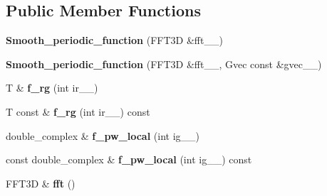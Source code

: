\subsection*{Public Member Functions}
\begin{DoxyCompactItemize}
\item 
\hypertarget{classsirius_1_1_smooth__periodic__function_a71442cf90200f79ef17bf18b0009fdb0}{}{\bfseries Smooth\+\_\+periodic\+\_\+function} (F\+F\+T3\+D \&fft\+\_\+\+\_\+)\label{classsirius_1_1_smooth__periodic__function_a71442cf90200f79ef17bf18b0009fdb0}

\item 
\hypertarget{classsirius_1_1_smooth__periodic__function_a8e8eb3649395eff9424649112195bcfe}{}{\bfseries Smooth\+\_\+periodic\+\_\+function} (F\+F\+T3\+D \&fft\+\_\+\+\_\+, Gvec const \&gvec\+\_\+\+\_\+)\label{classsirius_1_1_smooth__periodic__function_a8e8eb3649395eff9424649112195bcfe}

\item 
\hypertarget{classsirius_1_1_smooth__periodic__function_a4d7f66846cbf56aed86d37b8715a5592}{}T \& {\bfseries f\+\_\+rg} (int ir\+\_\+\+\_\+)\label{classsirius_1_1_smooth__periodic__function_a4d7f66846cbf56aed86d37b8715a5592}

\item 
\hypertarget{classsirius_1_1_smooth__periodic__function_a921b7339e39442c6f38be4566d864d8a}{}T const \& {\bfseries f\+\_\+rg} (int ir\+\_\+\+\_\+) const \label{classsirius_1_1_smooth__periodic__function_a921b7339e39442c6f38be4566d864d8a}

\item 
\hypertarget{classsirius_1_1_smooth__periodic__function_a2cad8092a1d4b51cef4d8a139fdb383f}{}double\+\_\+complex \& {\bfseries f\+\_\+pw\+\_\+local} (int ig\+\_\+\+\_\+)\label{classsirius_1_1_smooth__periodic__function_a2cad8092a1d4b51cef4d8a139fdb383f}

\item 
\hypertarget{classsirius_1_1_smooth__periodic__function_afb9cf34b6c1d73649efbef17fcde664e}{}const double\+\_\+complex \& {\bfseries f\+\_\+pw\+\_\+local} (int ig\+\_\+\+\_\+) const \label{classsirius_1_1_smooth__periodic__function_afb9cf34b6c1d73649efbef17fcde664e}

\item 
\hypertarget{classsirius_1_1_smooth__periodic__function_af99389c48a9c84a3d1170ef87dca60e8}{}F\+F\+T3\+D \& {\bfseries fft} ()\label{classsirius_1_1_smooth__periodic__function_af99389c48a9c84a3d1170ef87dca60e8}


\end{DoxyCompactItemize}
